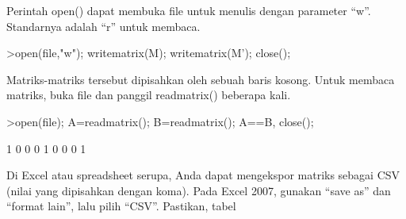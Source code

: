 \documentclass[a4paper,10pt]{article}
\begin{document}
\begin{eulernotebook}
\begin{eulercomment}
\begin{eulercomment}
\begin{eulercomment}
\begin{eulercomment}
\begin{eulercomment}
\begin{eulercomment}
\begin{eulercomment}
\begin{eulercomment}
\begin{eulercomment}
\begin{eulercomment}
\begin{eulercomment}
\begin{eulercomment}
\begin{eulercomment}
\begin{eulercomment}
\begin{eulercomment}
\begin{eulercomment}
\begin{eulercomment}
\begin{eulercomment}
\begin{eulercomment}
\begin{eulercomment}
\begin{eulercomment}
\begin{eulercomment}
\begin{eulercomment}
\begin{eulercomment}
\begin{eulercomment}
\begin{eulercomment}
\begin{eulercomment}
\begin{eulercomment}
\begin{eulercomment}
\begin{eulercomment}
\begin{eulercomment}
\begin{eulercomment}
\begin{eulercomment}
\begin{eulercomment}
\begin{eulercomment}
\begin{eulercomment}
\begin{eulercomment}
\begin{eulercomment}
\begin{eulercomment}
\begin{eulercomment}
\begin{eulercomment}
\begin{eulercomment}
\begin{eulercomment}
\begin{eulercomment}
\begin{eulercomment}
\begin{eulercomment}
\begin{eulercomment}
\begin{eulercomment}
\begin{eulercomment}
\begin{eulercomment}
\begin{eulercomment}
Perintah open() dapat membuka file untuk menulis dengan parameter “w”.
Standarnya adalah “r” untuk membaca.
\end{eulercomment}
\begin{eulerprompt}
>open(file,"w"); writematrix(M); writematrix(M'); close();
\end{eulerprompt}
\begin{eulercomment}
Matriks-matriks tersebut dipisahkan oleh sebuah baris kosong. Untuk
membaca matriks, buka file dan panggil readmatrix() beberapa kali.
\end{eulercomment}
\begin{eulerprompt}
>open(file); A=readmatrix(); B=readmatrix(); A==B, close();
\end{eulerprompt}
\begin{euleroutput}
          1         0         0 
          0         1         0 
          0         0         1 
\end{euleroutput}
\begin{eulercomment}
Di Excel atau spreadsheet serupa, Anda dapat mengekspor matriks
sebagai CSV (nilai yang dipisahkan dengan koma). Pada Excel 2007,
gunakan “save as” dan “format lain”, lalu pilih “CSV”. Pastikan, tabel

\end{eulercomment}
\end{eulercomment}
\end{eulercomment}
\end{eulercomment}
\end{eulercomment}
\end{eulercomment}
\end{eulercomment}
\end{eulercomment}
\end{eulercomment}
\end{eulercomment}
\end{eulercomment}
\end{eulercomment}
\end{eulercomment}
\end{eulercomment}
\end{eulercomment}
\end{eulercomment}
\end{eulercomment}
\end{eulercomment}
\end{eulercomment}
\end{eulercomment}
\end{eulercomment}
\end{eulercomment}
\end{eulercomment}
\end{eulercomment}
\end{eulercomment}
\end{eulercomment}
\end{eulercomment}
\end{eulercomment}
\end{eulercomment}
\end{eulercomment}
\end{eulercomment}
\end{eulercomment}
\end{eulercomment}
\end{eulercomment}
\end{eulercomment}
\end{eulercomment}
\end{eulercomment}
\end{eulercomment}
\end{eulercomment}
\end{eulercomment}
\end{eulercomment}
\end{eulercomment}
\end{eulercomment}
\end{eulercomment}
\end{eulercomment}
\end{eulercomment}
\end{eulercomment}
\end{eulercomment}
\end{eulercomment}
\end{eulercomment}
\end{eulercomment}
\end{eulernotebook}
\end{document}
